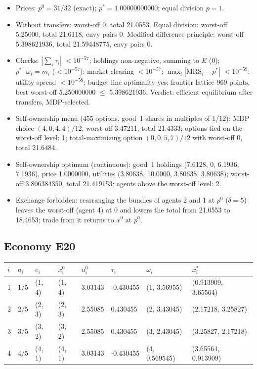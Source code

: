 \begin{itemize}[leftmargin=1.2em,itemsep=0pt,topsep=2pt]\footnotesize
\item Prices: $p^0 = 31/32$ (exact); $p^* = 1.00000000000$; equal division $p = 1$.
\item Without transfers: worst-off 0, total 21.0553. Equal division: worst-off 5.25000, total 21.6118, envy pairs 0. Modified difference principle: worst-off 5.398621936, total 21.59448775, envy pairs 0.
\item Checks: $|\sum_i\tau_i|$ $<10^{-57}$; holdings non-negative, summing to $E$ (0); $p^*\cdot\omega_i = m_i$ ($<10^{-57}$); market clearing $<10^{-57}$; $\max_i|\mathrm{MRS}_i - p^*|$ $<10^{-59}$; utility spread $<10^{-58}$; budget-line optimality yes; frontier lattice 969 points, best worst-off 5.250000000 $\leq$ 5.398621936. Verdict: efficient equilibrium after transfers, MDP-selected.
\item Self-ownership menu (455 options, good~1 shares in multiples of $1/12$): MDP choice $(4, 0, 4, 4)/12$, worst-off 3.47211, total 21.4333; options tied on the worst-off level: 1; total-maximizing option $(0, 0, 5, 7)/12$ with worst-off 0, total 21.6484.
\item Self-ownership optimum (continuous): good~1 holdings (7.6128, 0, 6.1936, 7.1936), price 1.0000000, utilities (3.80638, 10.0000, 3.80638, 3.80638); worst-off 3.806384350, total 21.419153; agents above the worst-off level: 2.
\item Exchange forbidden: rearranging the bundles of agents 2 and 1 at $p^0$ ($\delta = 5$) leaves the worst-off (agent 4) at 0 and lowers the total from 21.0553 to 18.4653; trade from it returns to $x^0$ at $p^0$.
\end{itemize}

\subsection*{Economy E20}
\label{ec:E20}
{\scriptsize\setlength{\tabcolsep}{3pt}
\begin{tabular}{@{}llllllll@{}}
\toprule
$i$ & $a_i$ & $e_i$ & $x^0_i$ & $u^0_i$ & $\tau_i$ & $\omega_i$ & $x^*_i$ \\
\midrule
1 & 1/5 & (1, 4) & (1, 4) & 3.03143 & -0.430455 & (1, 3.56955) & (0.913909, 3.65564) \\
2 & 2/5 & (2, 3) & (2, 3) & 2.55085 & 0.430455 & (2, 3.43045) & (2.17218, 3.25827) \\
3 & 3/5 & (3, 2) & (3, 2) & 2.55085 & 0.430455 & (3, 2.43045) & (3.25827, 2.17218) \\
4 & 4/5 & (4, 1) & (4, 1) & 3.03143 & -0.430455 & (4, 0.569545) & (3.65564, 0.913909) \\
\bottomrule\end{tabular}}

